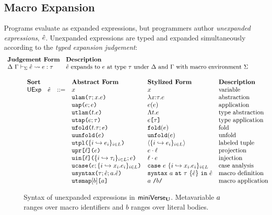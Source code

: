 \subsection{Macro Expansion}
Programs evaluate as expanded expressions, but programmers author \emph{unexpanded expressions}, $\hat{e}$. Unexpanded expressions are typed and expanded simultaneously according to the \emph{typed expansion judgement}:
\[\begin{array}{ll}
\textbf{Judgement Form} & \textbf{Description}\\
\Delta~\Gamma \vdash_{\Sigma} \hat{e} \leadsto e : \tau & \text{$\hat{e}$ expands to $e$ at type $\tau$ under $\Delta$ and $\Gamma$ with macro environment $\Sigma$}
\end{array}\]

\begin{figure}
$\begin{array}{lllllll}
\textbf{Sort} & & & \textbf{Abstract Form} & \textbf{Stylized Form} & \textbf{Description}\\
\mathsf{UExp} & \hat{e} & ::= & x & x & \text{variable}\\
&&& \texttt{ulam}\texttt{(}\tau; x.e\texttt{)} & \lambda x{:}\tau.e & \text{abstraction}\\
&&& \texttt{uap}\texttt{(}e; e\texttt{)} & e(e) & \text{application}\\
&&& \texttt{utlam}\texttt{(}t.e\texttt{)} & \Lambda t.e & \text{type abstraction}\\
&&& \texttt{utap}\texttt{(}e; \tau\texttt{)} & e\texttt{[}\tau\texttt{]} & \text{type application}\\
&&& \texttt{ufold}\texttt{(}t.\tau; e\texttt{)} & \texttt{fold}(e) & \text{fold}\\
&&& \texttt{uunfold}\texttt{(}e\texttt{)} & \texttt{unfold}(e) & \text{unfold}\\
&&& \texttt{utpl}\texttt{(}\{i \hookrightarrow e_{i}\}_{i \in L}\texttt{)} & \langle \{i \hookrightarrow e_{i}\}_{i \in L}\rangle & \text{labeled tuple}\\
&&& \texttt{upr}\texttt{[}\ell\texttt{](}e\texttt{)} & e \cdot \ell & \text{projection}\\
&&& \texttt{uin}\texttt{[}\ell\texttt{](}\{i \hookrightarrow \tau_{i}\}_{i \in L}; e\texttt{)} & \ell \cdot e & \text{injection}\\
&&& \texttt{ucase}\texttt{(}e; \{i \hookrightarrow x_{i}.e_{i}\}_{i \in L}\texttt{)} & \texttt{case}~e~\{i \hookrightarrow x_{i}.e_{i}\}_{i \in L} & \text{case analysis}\\
&&& \texttt{usyntax}\texttt{(}\tau; \hat{e}; a.\hat{e}\texttt{)} & \texttt{syntax}~a~\texttt{at}~\tau~\{\hat{e}\}~\texttt{in}~\hat{e} & \text{macro definition}\\
&&& \texttt{utsmap}[b]\texttt{[}a\texttt{]} & a~\texttt{/}b\texttt{/} & \text{macro application}
\end{array}$
\caption[Syntax of unexpanded expressions in $\miniVerseU$.]{Syntax of unexpanded expressions in $\miniVerseU$. Metavariable $a$ ranges over macro identifiers and $b$ ranges over literal bodies.}
\label{fig:U-unexpanded-terms}
\end{figure}




